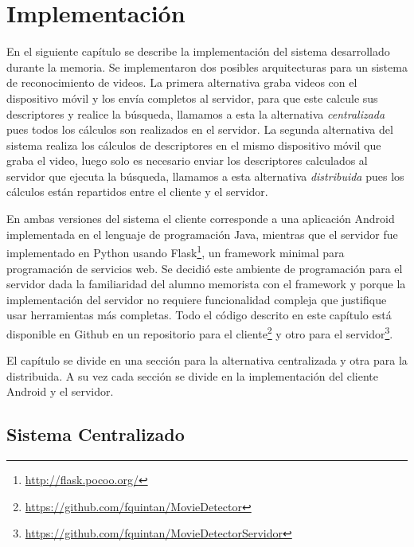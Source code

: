 \chapter{Implementación}\label{implementacion}
En el siguiente capítulo se describe la implementación del sistema desarrollado durante la memoria. Se implementaron dos posibles arquitecturas para un sistema de reconocimiento de videos. La primera alternativa graba videos con el dispositivo móvil y los envía completos al servidor, para que este calcule sus descriptores y realice la búsqueda, llamamos a esta la alternativa \emph{centralizada} pues todos los cálculos son realizados en el servidor. La segunda alternativa del sistema realiza los cálculos de descriptores en el mismo dispositivo móvil que graba el video, luego solo es necesario enviar los descriptores calculados al servidor que ejecuta la búsqueda, llamamos a esta alternativa \emph{distribuida} pues los cálculos están repartidos entre el cliente y el servidor.

En ambas versiones del sistema el cliente corresponde a una aplicación Android implementada en el lenguaje de programación Java, mientras que el servidor fue implementado en Python usando Flask\footnote{\url{http://flask.pocoo.org/}}, un framework minimal para programación de servicios web. Se decidió este ambiente de programación para el servidor dada la familiaridad del alumno memorista con el framework y porque la implementación del servidor no requiere funcionalidad compleja que justifique usar herramientas más completas. Todo el código descrito en este capítulo está disponible en Github en un repositorio para el cliente\footnote{\url{https://github.com/fquintan/MovieDetector}} y otro para el servidor\footnote{\url{https://github.com/fquintan/MovieDetectorServidor}}.

El capítulo se divide en una sección para la alternativa centralizada y otra para la distribuida. A su vez cada sección se divide en la implementación del cliente Android y el servidor.


\section{Sistema Centralizado}\label{central}

